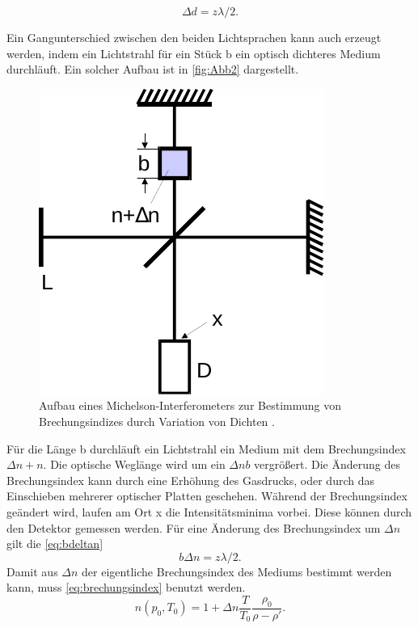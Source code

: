 \begin{equation}
    \Delta d = z \lambda/2. 
    \label{eq:deltad}
\end{equation}

Ein Gangunterschied zwischen den beiden Lichtsprachen kann auch erzeugt werden, indem ein Lichtstrahl für ein Stück b ein optisch dichteres Medium durchläuft.
Ein solcher Aufbau ist in \autoref{fig:Abb2} dargestellt.
\begin{figure}[H]
    \centering
    \includegraphics{figures/Abb2.pdf}
    \caption{Aufbau eines Michelson-Interferometers zur Bestimmung von Brechungsindizes durch Variation von Dichten \cite{ap11}.}
    \label{fig:Abb2}
\end{figure}

Für die Länge b durchläuft ein Lichtstrahl ein Medium mit dem Brechungsindex $ \Delta n + n$. Die optische Weglänge wird um ein $\Delta n b$ vergrößert.
Die Änderung des Brechungsindex kann durch eine Erhöhung des Gasdrucks, oder durch das Einschieben mehrerer optischer Platten geschehen.
Während der Brechungsindex geändert wird, laufen am Ort x die Intensitätsminima vorbei. Diese können durch den Detektor gemessen werden.
Für eine Änderung des Brechungsindex um $\Delta n$ gilt die \eqref{eq:bdeltan}
\begin{equation}
    b \Delta n = z λ/2. 
    \label{eq:bdeltan}
\end{equation}
Damit aus $\Delta n$ der eigentliche Brechungsindex des Mediums bestimmt werden kann, muss \eqref{eq:brechungsindex} benutzt werden.
\begin{equation}
    n(p_0,T_0) = 1 + \Delta n \frac{T}{T_0} \frac{\rho_0}{\rho - \rho'} .
    \label{eq:brechungsindex}
\end{equation}
